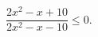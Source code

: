 \begin{ex}[type=inequality]
	\begin{condition}
		$ \dfrac{2x^2 - x + 10}{2x^2 - x - 10}\leqslant0 . $
	\end{condition}
\end{ex}